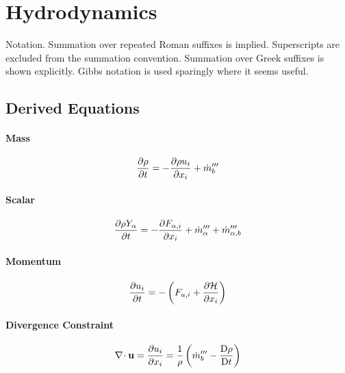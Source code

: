 \documentclass[11pt]{article}
\begin{document}
\section{Hydrodynamics}

Notation.  Summation over repeated Roman suffixes is implied.  Superscripts are excluded from the summation convention.  Summation over Greek suffixes is shown explicitly.  Gibbs notation is used sparingly where it seems useful.

\subsection{Derived Equations}

\paragraph{Mass}

\begin{equation}
\label{eqn_mass}
\frac{\partial \rho}{\partial t} = - \frac{\partial \rho u_i}{\partial x_i} + \dot{m}_b^{\prime\prime\prime}
\end{equation}

\paragraph{Scalar}

\begin{equation}
\label{eqn_scalar}
\frac{\partial \rho Y_\alpha}{\partial t} = - \frac{\partial F_{\alpha,i}}{\partial x_i} + \dot{m}_{\alpha}^{\prime\prime\prime} + \dot{m}_{\alpha,b}^{\prime\prime\prime}
\end{equation}

\paragraph{Momentum}

\begin{equation}
\label{eqn_momentum}
\frac{\partial u_i}{\partial t} = - \left( F_{u,i} + \frac{\partial \cal H}{\partial x_i} \right)
\end{equation}

\paragraph{Divergence Constraint}

\begin{equation}
\label{eqn_divergence}
\nabla\!\cdot \mathbf{u} = \frac{\partial u_i}{\partial x_i} = \frac{1}{\rho}\left(\dot{m}_b^{\prime\prime\prime} - \frac{\mbox{D}\rho}{\mbox{D}t}\right)
\end{equation}
\end{document}
